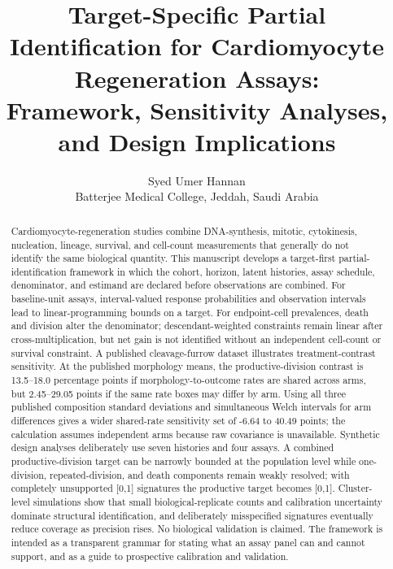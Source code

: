 \documentclass[11pt]{article}
\title{Target-Specific Partial Identification for Cardiomyocyte Regeneration Assays:\\Framework, Sensitivity Analyses, and Design Implications}
\author{Syed Umer Hannan\\Batterjee Medical College, Jeddah, Saudi Arabia}
\date{}
\begin{document}
\maketitle

\begin{abstract}
Cardiomyocyte-regeneration studies combine DNA-synthesis, mitotic, cytokinesis, nucleation, lineage, survival, and cell-count measurements that generally do not identify the same biological quantity. This manuscript develops a target-first partial-identification framework in which the cohort, horizon, latent histories, assay schedule, denominator, and estimand are declared before observations are combined. For baseline-unit assays, interval-valued response probabilities and observation intervals lead to linear-programming bounds on a target. For endpoint-cell prevalences, death and division alter the denominator; descendant-weighted constraints remain linear after cross-multiplication, but net gain is not identified without an independent cell-count or survival constraint. A published cleavage-furrow dataset illustrates treatment-contrast sensitivity. At the published morphology means, the productive-division contrast is 13.5--18.0 percentage points if morphology-to-outcome rates are shared across arms, but 2.45--29.05 points if the same rate boxes may differ by arm. Using all three published composition standard deviations and simultaneous Welch intervals for arm differences gives a wider shared-rate sensitivity set of -6.64 to 40.49 points; the calculation assumes independent arms because raw covariance is unavailable. Synthetic design analyses deliberately use seven histories and four assays. A combined productive-division target can be narrowly bounded at the population level while one-division, repeated-division, and death components remain weakly resolved; with completely unsupported [0,1] signatures the productive target becomes [0,1]. Cluster-level simulations show that small biological-replicate counts and calibration uncertainty dominate structural identification, and deliberately misspecified signatures eventually reduce coverage as precision rises. No biological validation is claimed. The framework is intended as a transparent grammar for stating what an assay panel can and cannot support, and as a guide to prospective calibration and validation.
\end{abstract}
\end{document}
